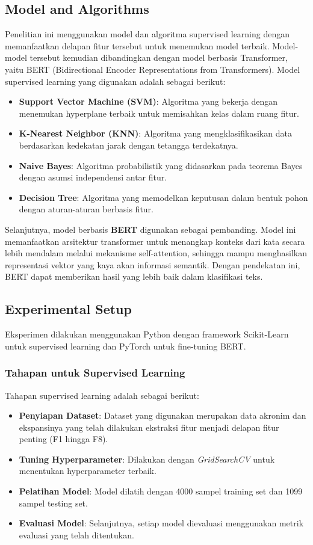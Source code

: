 \documentclass{article}\usepackage{float}
\begin{document}
\subsection{Model and Algorithms }
Penelitian ini menggunakan model dan algoritma supervised learning dengan memanfaatkan delapan fitur tersebut untuk menemukan model terbaik. Model-model tersebut kemudian dibandingkan dengan model berbasis Transformer, yaitu BERT (Bidirectional Encoder Representations from Transformers). Model supervised learning yang digunakan adalah sebagai berikut:
\begin{itemize}
    \item \textbf{Support Vector Machine (SVM)}: Algoritma yang bekerja dengan menemukan hyperplane terbaik untuk memisahkan kelas dalam ruang fitur.
    \item \textbf{K-Nearest Neighbor (KNN)}: Algoritma yang mengklasifikasikan data berdasarkan kedekatan jarak dengan tetangga terdekatnya.
    \item \textbf{Naive Bayes}: Algoritma probabilistik yang didasarkan pada teorema Bayes dengan asumsi independensi antar fitur.
    \item \textbf{Decision Tree}: Algoritma yang memodelkan keputusan dalam bentuk pohon dengan aturan-aturan berbasis fitur.
\end{itemize}

Selanjutnya, model berbasis \textbf{BERT} digunakan sebagai pembanding. Model ini memanfaatkan arsitektur transformer untuk menangkap konteks dari kata secara lebih mendalam melalui mekanisme self-attention, sehingga mampu menghasilkan representasi vektor yang kaya akan informasi semantik. Dengan pendekatan ini, BERT dapat memberikan hasil yang lebih baik dalam klasifikasi teks.

\subsection{Experimental Setup }

Eksperimen dilakukan menggunakan Python dengan framework Scikit-Learn untuk supervised learning dan PyTorch untuk fine-tuning BERT.

\subsubsection*{Tahapan untuk Supervised Learning}
Tahapan supervised learning adalah sebagai berikut:
\begin{itemize}
    \item \textbf{Penyiapan Dataset}: Dataset yang digunakan merupakan data akronim dan ekspansinya yang telah dilakukan ekstraksi fitur menjadi delapan fitur penting (F1 hingga F8).
    \item \textbf{Tuning Hyperparameter}: Dilakukan dengan \textit{GridSearchCV} untuk menentukan hyperparameter terbaik.
    \item \textbf{Pelatihan Model}: Model dilatih dengan 4000 sampel training set dan 1099 sampel testing set.
    \item \textbf{Evaluasi Model}: Selanjutnya, setiap model dievaluasi menggunakan metrik evaluasi yang telah ditentukan.
\end{itemize}
\end{document}
